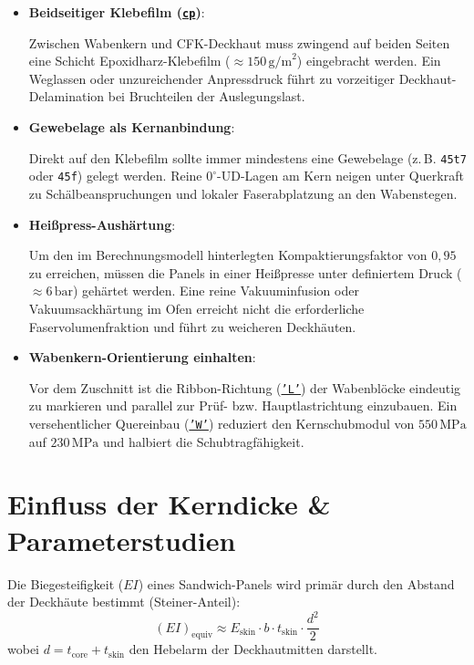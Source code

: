 \begin{itemize}
    \item \textbf{Beidseitiger Klebefilm (\hyperref[abk:CP]{\texttt{cp}})}: \par
    Zwischen Wabenkern und CFK-Deckhaut muss zwingend auf beiden Seiten eine Schicht Epoxidharz-Klebefilm ($\approx 150\,\text{g/m}^2$) eingebracht werden. Ein Weglassen oder unzureichender Anpressdruck führt zu vorzeitiger Deckhaut-Delamination bei Bruchteilen der Auslegungslast.

    \item \textbf{Gewebelage als Kernanbindung}: \par
    Direkt auf den Klebefilm sollte immer mindestens eine Gewebelage (z.\,B. \texttt{45t7} oder \texttt{45f}) gelegt werden. Reine $0^\circ$-UD-Lagen am Kern neigen unter Querkraft zu Schälbeanspruchungen und lokaler Faserabplatzung an den Wabenstegen.

    \item \textbf{Heißpress-Aushärtung}: \par
    Um den im Berechnungsmodell hinterlegten Kompaktierungsfaktor von $0{,}95$ zu erreichen, müssen die Panels in einer Heißpresse unter definiertem Druck ($\approx 6\,\text{bar}$) gehärtet werden. Eine reine Vakuuminfusion oder Vakuumsackhärtung im Ofen erreicht nicht die erforderliche Faservolumenfraktion und führt zu weicheren Deckhäuten.

    \item \textbf{Wabenkern-Orientierung einhalten}: \par
    Vor dem Zuschnitt ist die Ribbon-Richtung (\hyperref[abk:L]{\texttt{'L'}}) der Wabenblöcke eindeutig zu markieren und parallel zur Prüf- bzw. Hauptlastrichtung einzubauen. Ein versehentlicher Quereinbau (\hyperref[abk:W]{\texttt{'W'}}) reduziert den Kernschubmodul von $550\,\text{MPa}$ auf $230\,\text{MPa}$ und halbiert die Schubtragfähigkeit.
\end{itemize}

\section{Einfluss der Kerndicke \& Parameterstudien} \label{sec:kerndicke}

Die Biegesteifigkeit (\hyperref[abk:EI]{$EI$}) eines Sandwich-Panels wird primär durch den Abstand der Deckhäute bestimmt (Steiner-Anteil):
\begin{equation}
    (EI)_{\text{equiv}} \approx E_{\text{skin}} \cdot b \cdot t_{\text{skin}} \cdot \frac{d^2}{2}
\end{equation}
wobei $d = t_{\text{core}} + t_{\text{skin}}$ den Hebelarm der Deckhautmitten darstellt.


